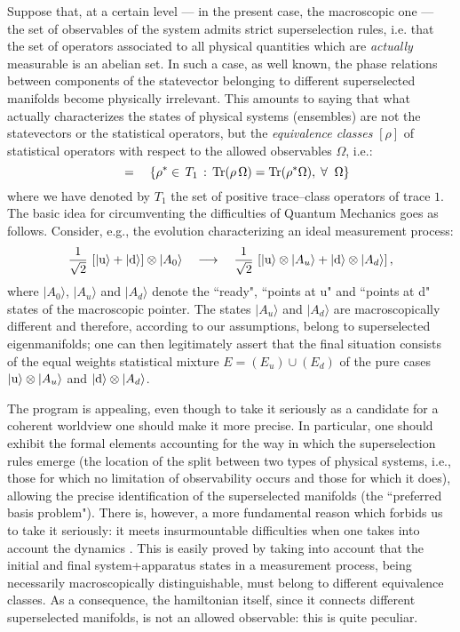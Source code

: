 \documentclass[10pt,a4paper]{article}
\begin{document}
Suppose that, at a certain level --- in the present case, the
macroscopic one --- the set of observables of the system admits
strict superselection rules, i.e. that the set of operators associated to
all physical quantities which are {\it actually} measurable is an abelian
set. In such a case, as well known, the phase relations between
components of the statevector belonging to different superselected
manifolds become physically irrelevant. This amounts to saying that what
actually characterizes the states of physical systems (ensembles) are not
the statevectors or the statistical operators, but the {\it equivalence
classes} $[\rho]$ of statistical operators with respect to the allowed
observables $\Omega$, i.e.:
\begin{equation}
[\rho] \quad = \quad \left\{\rho^{*}\in\, T_{1} \, :\,
\makebox{Tr}(\rho\,\Omega) = \makebox{Tr}(\rho^{*}\Omega),
\;\forall\;\; \Omega\right\}
\end{equation}
where we have denoted by $T_{1}$ the set of positive trace--class
operators of trace $1$. The basic idea for circumventing the
difficulties of Quantum Mechanics goes as follows. Consider, e.g.,
the evolution characterizing an ideal measurement process:
\begin{equation} \label{se}
\frac{1}{\sqrt{2}}\,\left[ |\makebox{u}\rangle +
|\makebox{d}\rangle \right]\otimes |A_{0}\rangle
\quad\longrightarrow\quad \frac{1}{\sqrt{2}}\,\left[
|\makebox{u}\rangle \otimes |A_{u}\rangle + |\makebox{d}\rangle
\otimes |A_{d}\rangle \right],
\end{equation}
where $|A_{0}\rangle$, $|A_{u}\rangle$ and $|A_{d}\rangle$ denote
the ``ready", ``points at u" and ``points at d" states of the
macroscopic pointer. The states $|A_{u}\rangle$ and
$|A_{d}\rangle$ are macroscopically different and therefore,
according to our assumptions, belong to superselected
eigenmanifolds; one can then legitimately assert that the final
situation consists of the equal weights statistical mixture
$E=(E_{u})\cup (E_{d})$ of the pure cases
$|\makebox{u}\rangle\otimes |A_{u}\rangle$ and
$|\makebox{d}\rangle\otimes |A_{d}\rangle$.

The program is appealing, even though to take it seriously as a
candidate for a coherent worldview one should make it more
precise. In particular, one should exhibit the formal elements
accounting for the way in which the superselection rules emerge
(the location of the split between two types of physical systems,
i.e., those for which no limitation of observability occurs and
those for which it does), allowing the precise identification of
the superselected manifolds (the ``preferred basis problem").
There is, however, a more fundamental reason which forbids us to
take it seriously: it meets insurmountable difficulties when one
takes into account the dynamics \cite{blm}. This is easily proved
by taking into account that the initial and final system+apparatus states
in a measurement process, being necessarily macroscopically
distinguishable, must belong to different equivalence classes. As
a consequence, the hamiltonian itself, since it connects different
superselected manifolds, is not an allowed observable: this is
quite peculiar.
\end{document}
